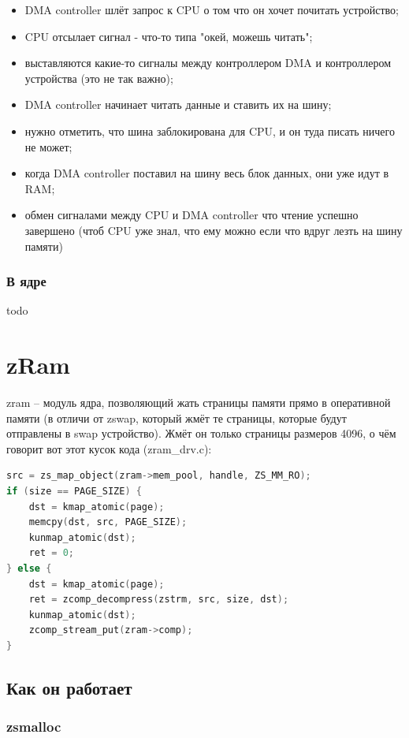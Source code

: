 \documentclass[12pt]{report}
\begin{document}
\begin{itemize}
	\item DMA controller шлёт запрос к CPU о том что он хочет почитать устройство;
	\item CPU отсылает сигнал - что-то типа "окей, можешь читать";
	\item выставляются какие-то сигналы между контроллером DMA и контроллером устройства (это не так важно);
	\item DMA controller начинает читать данные и ставить их на шину;
	\item нужно отметить, что шина заблокирована для CPU, и он туда писать ничего не может;
	\item когда DMA controller поставил на шину весь блок данных, они уже идут в RAM;
	\item обмен сигналами между CPU и DMA controller что чтение успешно завершено (чтоб CPU уже знал, что ему можно если что вдруг лезть на шину памяти)
\end{itemize}

\subsubsection{В ядре}

todo

\section*{zRam}

zram -- модуль ядра, позволяющий жать страницы памяти прямо в оперативной памяти (в отличи от zswap, который жмёт те страницы, которые будут отправлены в swap устройство). Жмёт он только страницы размеров 4096, о чём говорит вот этот кусок кода (zram\_drv.c):

\begin{lstlisting}[language=c]
src = zs_map_object(zram->mem_pool, handle, ZS_MM_RO);
if (size == PAGE_SIZE) {
	dst = kmap_atomic(page);
	memcpy(dst, src, PAGE_SIZE);
	kunmap_atomic(dst);
	ret = 0;
} else {
	dst = kmap_atomic(page);
	ret = zcomp_decompress(zstrm, src, size, dst);
	kunmap_atomic(dst);
	zcomp_stream_put(zram->comp);
}
\end{lstlisting}

\subsection*{Как он работает}

\subsubsection*{zsmalloc}
\end{document}
